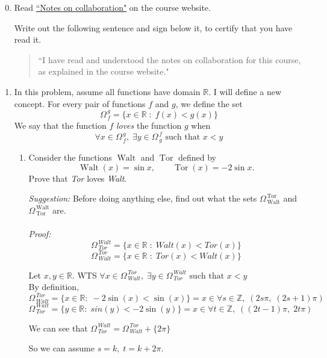 \documentclass[12pt]{exam}
\newcommand{\vv}{\vspace{.2cm}}
\newcommand{\R}{\mathbb{R}}
\newcommand{\Z}{\mathbb{Z}}
\newcommand{\M}[2]{\Omega^{\, #2}_{\, #1}}
\DeclareMathOperator{\Walt}{Walt}
\DeclareMathOperator{\Tor}{Tor}
\begin{document}
\begin{enumerate}

\setcounter{enumi}{-1}

\item Read \href{https://www.math.toronto.edu/~alfonso/137/PS/137_2021_collaboration.pdf}{``Notes on collaboration"} on the course website.

	Write out the following sentence and sign below it, to certify that you have read it.
	
	\begin{quote}
		``I have read and understood the notes on collaboration for this course, as explained in the course website."
	\end{quote}

\vv
\newpage

\item  \label{likes}  In this problem, assume all functions have domain $\R$.  I will define a new concept.  For every pair of functions $f$ and $g$, we define the set
	$$
		\M{f}{g} = \{x \in \R \; : \; f(x) < g(x) \}
	$$ 
	We say that the function $f$ \emph{loves} the function $g$ when
	$$
		\forall x \in \M{f}{g}, \; \exists y \in \M{g}{f} \mbox{ such that } x < y
	$$

	\begin{enumerate}
		\item  Consider the functions $\Walt$ and $\Tor$ defined by
			$$
				\Walt(x) = \sin x, \quad \quad \Tor(x) = - 2\sin x.
			$$
		Prove that \emph{Tor} loves \emph{Walt}.
		
		\vv
		\emph{Suggestion:}  Before doing anything else, find out what the sets $\M{\Walt}{\Tor}$ and $\M{\Tor}{\Walt}$ are.\\
		\\
		\emph{Proof:}
		$$
		    \M{Tor}{Walt}=\{x \in \R \; : \; Walt(x) < Tor(x) \}
		$$
		$$
		    \M{Walt}{Tor}=\{x \in \R \; : \; Tor(x) < Walt(x) \}
		$$
		\vv

		Let $x, y \in \R$. WTS $\forall x \in \M{Walt}{Tor}, \; \exists y \in \M{Tor}{Walt} \mbox{ such that } x < y$\\
		\vv
		By definition, 
		$$ 
			\M{Walt}{Tor} = \{x \in \R : \; - 2\sin(x) < \sin(x) \} = x \in \forall s \in \Z, \; (2s\pi, \; (2s + 1)\pi)
		$$
		$$ 
			\M{Tor}{Walt} = \{y \in \R : \; sin(y) < - 2\sin(y) \} = x \in \forall t \in \Z, \; ((2t - 1)\pi, \; 2t\pi)
		$$

		We can see that $\M{Tor}{Walt}=\M{Walt}{Tor} + \{2\pi\}$

		So we can assume $s = k, \; t = k + 2\pi$.\\


\end{enumerate}
\end{enumerate}
\end{document}
